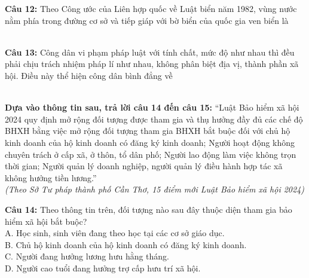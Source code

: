 \documentclass[12pt,a4paper]{article}
\begin{document}
\noindent \textbf{Câu 12:} Theo Công ước của Liên hợp quốc về Luật biển năm 1982, vùng nước nằm phía trong đường cơ sở và tiếp giáp với bờ biển của quốc gia ven biển là\\
\noindent{}\\
\noindent{}

\noindent \textbf{Câu 13:} Công dân vi phạm pháp luật với tính chất, mức độ như nhau thì đều phải chịu trách nhiệm pháp lí như nhau, không phân biệt địa vị, thành phần xã hội. Điều này thể hiện công dân bình đẳng về\\
\noindent{}\\
\noindent{}

\noindent \textbf{Dựa vào thông tin sau, trả lời câu 14 đến câu 15:} ``Luật Bảo hiểm xã hội 2024 quy định mở rộng đối tượng được tham gia và thụ hưởng đầy đủ các chế độ BHXH bằng việc mở rộng đối tượng tham gia BHXH bắt buộc đối với chủ hộ kinh doanh của hộ kinh doanh có đăng ký kinh doanh; Người hoạt động không chuyên trách ở cấp xã, ở thôn, tổ dân phố; Người lao động làm việc không trọn thời gian; Người quản lý doanh nghiệp, người quản lý điều hành hợp tác xã không hưởng tiền lương.''\\
\hspace*{\fill}\textit{(Theo Sở Tư pháp thành phố Cần Thơ, 15 điểm mới Luật Bảo hiểm xã hội 2024)}

\noindent \textbf{Câu 14:} Theo thông tin trên, đối tượng nào sau đây thuộc diện tham gia bảo hiểm xã hội bắt buộc?\\
\noindent A. Học sinh, sinh viên đang theo học tại các cơ sở giáo dục.\\
\noindent B. Chủ hộ kinh doanh của hộ kinh doanh có đăng ký kinh doanh.\\
\noindent C. Người đang hưởng lương hưu hằng tháng.\\
\noindent D. Người cao tuổi đang hưởng trợ cấp hưu trí xã hội.
\end{document}
